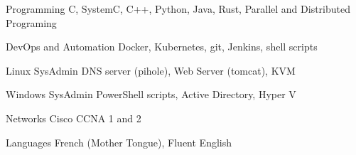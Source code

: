 

\begin{cvskills}
{

    \cvskill
    {Programming} %
    {C, SystemC, C++, Python, Java, Rust, Parallel and Distributed Programing} %



	}{}
{
    \cvskill
    {DevOps and Automation} %
    {Docker, Kubernetes, git, Jenkins, shell scripts} %

    \cvskill
    {Linux SysAdmin} %
    {DNS server (pihole), Web Server (tomcat), KVM} %

    \cvskill
    {Windows SysAdmin} %
    {PowerShell scripts, Active Directory, Hyper V} %

    \cvskill
    {Networks} %
    {Cisco CCNA 1 and 2} %

}{}

	\cvskill
	{Languages} %
	{French (Mother Tongue), Fluent English} %
\end{cvskills}
